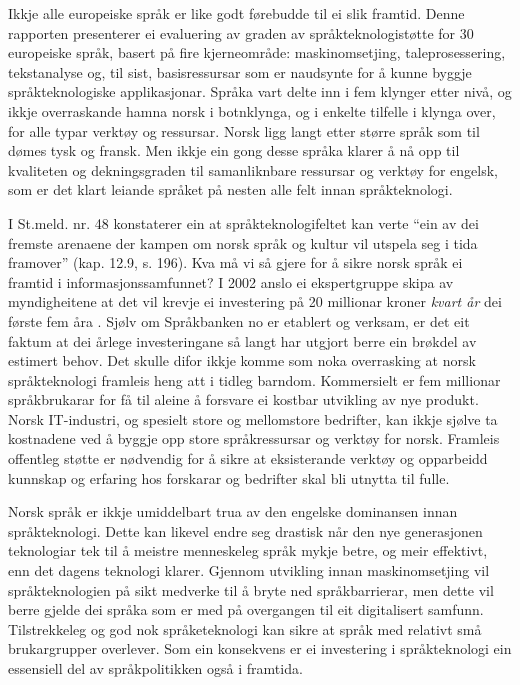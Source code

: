 \begin{multicols}{2}
Ikkje alle europeiske språk er like godt førebudde til ei slik framtid. Denne rapporten presenterer ei evaluering av graden av språkteknologistøtte for 30 europeiske språk, basert på fire kjerneområde: maskinomsetjing, taleprosessering, tekstanalyse og, til sist, basisressursar som er naudsynte for å kunne byggje språkteknologiske applikasjonar. Språka vart delte inn i fem klynger etter nivå, og ikkje overraskande hamna norsk i botnklynga, og i enkelte tilfelle i klynga over, for alle typar verktøy og ressursar. Norsk ligg langt etter større språk som til dømes tysk og fransk. Men ikkje ein gong desse språka klarer å nå opp til kvaliteten og dekningsgraden til samanliknbare ressursar og verktøy for engelsk, som er det klart leiande språket på nesten alle felt innan språkteknologi.

I St.meld. nr. 48 \cite{stm48:2002} konstaterer ein at språkteknologifeltet kan verte ``ein av dei fremste arenaene der kampen om norsk språk og kultur vil utspela seg i tida framover'' (kap. 12.9, s. 196). Kva må vi så gjere for å sikre norsk språk ei framtid i informasjonssamfunnet? I 2002 anslo ei ekspertgruppe skipa av myndigheitene at det vil krevje ei investering på 20 millionar kroner \emph{kvart år} dei første fem åra \cite{SR:2002:eng}. Sjølv om Språkbanken no er etablert og verksam, er det eit faktum at dei årlege investeringane så langt har utgjort berre ein brøkdel av estimert behov. Det skulle difor ikkje komme som noka overrasking at norsk språkteknologi framleis heng att i tidleg barndom. Kommersielt er fem millionar språkbrukarar for få til aleine å forsvare ei kostbar utvikling av nye produkt. Norsk IT-industri, og spesielt store og mellomstore bedrifter, kan ikkje sjølve ta kostnadene ved å byggje opp store språkressursar og verktøy for norsk. Framleis offentleg støtte er nødvendig for å sikre at eksisterande verktøy og opparbeidd kunnskap og erfaring hos forskarar og bedrifter skal bli utnytta til fulle. 

Norsk språk er ikkje umiddelbart trua av den engelske dominansen innan språkteknologi. Dette kan likevel endre seg drastisk når den nye generasjonen teknologiar tek til å meistre menneskeleg språk mykje betre, og meir effektivt, enn det dagens teknologi klarer. Gjennom utvikling innan maskinomsetjing vil språkteknologien på sikt medverke til å bryte ned språkbarrierar, men dette vil berre gjelde dei språka som er med på overgangen til eit digitalisert samfunn. Tilstrekkeleg og god nok språketeknologi kan sikre at språk med relativt små brukargrupper overlever. Som ein konsekvens er ei investering i språkteknologi ein essensiell del av språkpolitikken også i framtida.                                


\end{multicols}
